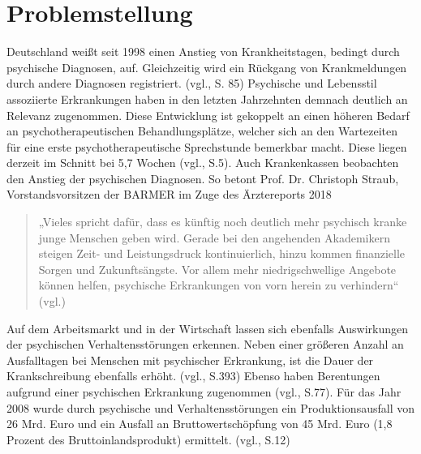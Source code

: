 
\section{Problemstellung}
\label{ch:Problemstellung}


Deutschland weißt seit 1998 einen Anstieg von Krankheitstagen, bedingt durch psychische Diagnosen, auf. Gleichzeitig wird ein Rückgang von Krankmeldungen durch andere Diagnosen registriert. (vgl.\cite{Jacobi2014}, S. 85) Psychische und Lebensstil assoziierte Erkrankungen haben in den letzten Jahrzehnten demnach deutlich an Relevanz zugenommen. Diese Entwicklung ist gekoppelt an einen höheren Bedarf an psychotherapeutischen Behandlungsplätze, welcher sich an den Wartezeiten für eine erste psychotherapeutische Sprechstunde bemerkbar macht. Diese liegen derzeit im Schnitt bei 5,7 Wochen (vgl.\cite{Microsof77:online}, S.5). Auch Krankenkassen beobachten den Anstieg der psychischen Diagnosen. So betont Prof. Dr. Christoph Straub, Vorstandsvorsitzen der BARMER im Zuge des Ärztereports 2018 
\begin{quote}
„Vieles spricht dafür, dass es künftig noch deutlich mehr psychisch kranke junge Menschen geben wird. Gerade bei den angehenden Akademikern steigen Zeit- und Leistungsdruck kontinuierlich, hinzu kommen finanzielle Sorgen und Zukunftsängste. Vor allem mehr niedrigschwellige Angebote können helfen, psychische Erkrankungen von vorn herein zu verhindern“ (vgl.\cite{Arztrepo90:online})
\end{quote}
Auf dem Arbeitsmarkt und in der Wirtschaft lassen sich ebenfalls Auswirkungen der psychischen Verhaltensstörungen erkennen. Neben einer größeren Anzahl an Ausfalltagen bei Menschen mit psychischer Erkrankung, ist die Dauer der Krankschreibung ebenfalls erhöht. (vgl.\cite{Nubling2014}, S.393) Ebenso haben Berentungen aufgrund einer psychischen Erkrankung zugenommen (vgl.\cite{Jacobi2014}\cite{Nubling2014}, S.77). Für das Jahr 2008 wurde durch psychische und Verhaltensstörungen ein Produktionsausfall von 26 Mrd. Euro und ein Ausfall an Bruttowertschöpfung von 45 Mrd. Euro (1,8 Prozent des Bruttoinlandsprodukt) ermittelt. (vgl.\cite{EntwurfeinesDreizehntenGesetzeszurAnderungdesAtomgesetzesBundesregierungDeutschland2012}, S.12)

